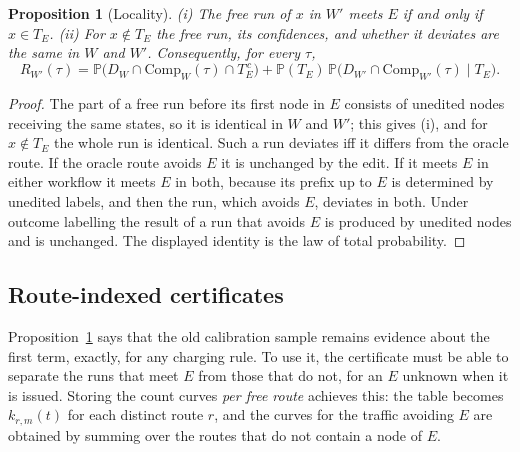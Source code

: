 \documentclass[11pt]{article}
\newtheorem{proposition}[theorem]{Proposition}
\theoremstyle{definition}
\theoremstyle{remark}
\newcommand{\Prob}{\mathbb{P}}
\newcommand{\Comp}{\mathrm{Comp}}
\begin{document}
\begin{proposition}[Locality]\label{prop:local}
\textup{(i)} The free run of $x$ in $W'$ meets $E$ if and only if $x\in T_E$.
\textup{(ii)} For $x\notin T_E$ the free run, its confidences, and whether it deviates are the
same in $W$ and $W'$. Consequently, for every $\tau$,
\[
R_{W'}(\tau)=\Prob\bigl(D_W\cap\Comp_W(\tau)\cap T_E^{\,c}\bigr)
+\Prob(T_E)\,\Prob\bigl(D_{W'}\cap\Comp_{W'}(\tau)\mid T_E\bigr).
\]
\end{proposition}
\begin{proof}
The part of a free run before its first node in $E$ consists of unedited nodes receiving the
same states, so it is identical in $W$ and $W'$; this gives (i), and for $x\notin T_E$ the
whole run is identical. Such a run deviates iff it differs from the oracle route. If the
oracle route avoids $E$ it is unchanged by the edit. If it meets $E$ in either workflow it
meets $E$ in both, because its prefix up to $E$ is determined by unedited labels, and then the
run, which avoids $E$, deviates in both. Under outcome labelling the result of a run that
avoids $E$ is produced by unedited nodes and is unchanged. The displayed identity is the law
of total probability.
\end{proof}

\subsection{Route-indexed certificates}

Proposition~\ref{prop:local} says that the old calibration sample remains evidence about the
first term, exactly, for any charging rule. To use it, the certificate must be able to separate
the runs that meet $E$ from those that do not, for an $E$ unknown when it is issued. Storing
the count curves \emph{per free route} achieves this: the table becomes
$k_{r,m}(t)$ for each distinct route $r$, and the curves for the traffic avoiding $E$ are
obtained by summing over the routes that do not contain a node of $E$.
\end{document}
